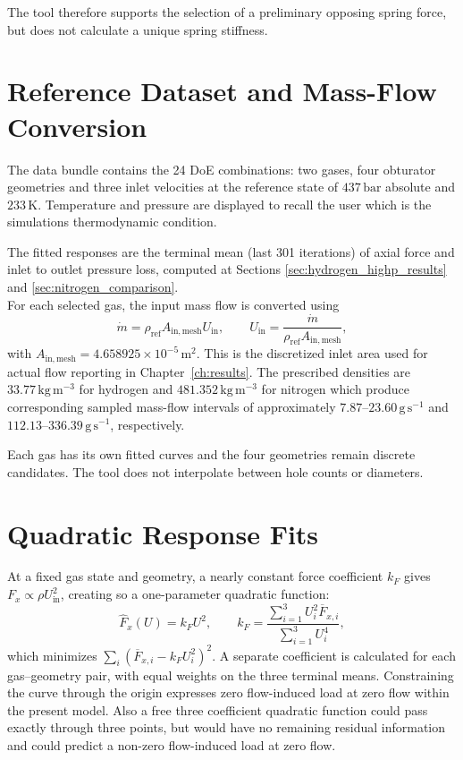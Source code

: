 The tool therefore supports the selection of a preliminary opposing spring force, but does not calculate a unique spring stiffness.

\section{Reference Dataset and Mass-Flow Conversion}
\label{sec:tool_dataset_priority}
\label{sec:tool_430bar}

The data bundle contains the 24 DoE combinations: two gases, four obturator geometries and three inlet velocities at the reference state of $437\,\mathrm{bar}$ absolute and $233\,\mathrm{K}$. 
Temperature and pressure are displayed to recall the user which is the simulations thermodynamic condition.

The fitted responses are the terminal mean (last 301 iterations) of axial force and inlet to outlet pressure loss, computed at Sections \ref{sec:hydrogen_highp_results} and \ref{sec:nitrogen_comparison}.\\

For each selected gas, the input mass flow is converted using
\begin{equation}
\dot m=\rho_{\mathrm{ref}}A_{\mathrm{in,mesh}}U_{\mathrm{in}},
\qquad
U_{\mathrm{in}}=\frac{\dot m}{\rho_{\mathrm{ref}}A_{\mathrm{in,mesh}}},
\label{eq:tool_mass_conversion}
\end{equation}
with $A_{\mathrm{in,mesh}}=4.658925\times10^{-5}\,\mathrm{m^2}$. This is the discretized inlet area used for actual flow reporting in Chapter~\ref{ch:results}. The prescribed densities are $33.77\,\mathrm{kg\,m^{-3}}$ for hydrogen and $481.352\,\mathrm{kg\,m^{-3}}$ for nitrogen which produce corresponding sampled mass-flow intervals of approximately $7.87$--$23.60\,\mathrm{g\,s^{-1}}$ and $112.13$--$336.39\,\mathrm{g\,s^{-1}}$, respectively.

Each gas has its own fitted curves and the four geometries remain discrete candidates. The tool does not interpolate between hole counts or diameters. 

\section{Quadratic Response Fits}
\label{sec:selection_coverage}

At a fixed gas state and geometry, a nearly constant force coefficient $k_F$ gives $F_x\propto\rho U_{\mathrm{in}}^2$, creating so a one-parameter quadratic function:
\begin{equation}
\widehat F_x(U)=k_F U^2,
\qquad
k_F=\frac{\sum_{i=1}^{3}U_i^2\overline F_{x,i}}
{\sum_{i=1}^{3}U_i^4},
\label{eq:tool_quadratic_fit}
\end{equation}
which minimizes $\sum_i(\overline F_{x,i}-k_FU_i^2)^2$. A separate coefficient is calculated for each gas--geometry pair, with equal weights on the three terminal means. Constraining the curve through the origin expresses zero flow-induced load at zero flow within the present model. Also a free three coefficient quadratic function could pass exactly through three points, but would have no remaining residual information and could predict a non-zero flow-induced load at zero flow.\\

